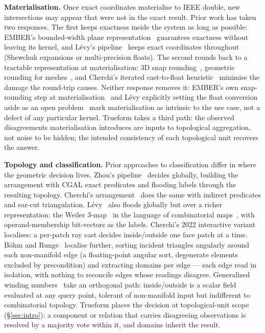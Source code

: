 \documentclass{egpubl}
\begin{document}
\textbf{Materialisation.} Once exact coordinates materialise to IEEE double, new intersections may appear that were not in the exact result. Prior work has taken two responses. The first keeps exactness inside the system as long as possible: EMBER's bounded-width plane representation~\cite{Trettner2022,NehringWirxel2021} guarantees exactness without leaving its kernel, and L\'evy's pipeline~\cite{Levy2025} keeps exact coordinates throughout (Shewchuk expansions or multi-precision floats). The second rounds back to a tractable representation at materialisation: 3D snap rounding~\cite{DevillersLazardLenhart2018,Valque2019}, geometric rounding for meshes~\cite{MilenkovicSacks2019}, and Cherchi's iterated cast-to-float heuristic~\cite{Cherchi2020} minimise the damage the round-trip causes. Neither response removes it: EMBER's own snap-rounding step at materialisation~\cite{Trettner2022} and L\'evy explicitly setting the float conversion aside as an open problem~\cite{Levy2025} mark materialisation as intrinsic to the use case, not a defect of any particular kernel. Trueform takes a third path: the observed disagreements materialisation introduces are inputs to topological aggregation, not noise to be hidden; the intended consistency of each topological unit recovers the answer.

\textbf{Topology and classification.} Prior approaches to classification differ in where the geometric decision lives. Zhou's pipeline~\cite{Zhou2016} decides globally, building the arrangement with CGAL exact predicates and flooding labels through the resulting topology. Cherchi's arrangement~\cite{Cherchi2020} does the same with indirect predicates and ear-cut triangulation. L\'evy~\cite{Levy2025} also floods globally but over a richer representation: the Weiler 3-map~\cite{Weiler1985} in the language of combinatorial maps~\cite{Lienhardt1988}, with operand-membership bit-vectors as the labels. Cherchi's 2022 interactive variant~\cite{Cherchi2022} localises: a per-patch ray cast decides inside/outside one face patch at a time. B\"ohm and Runge~\cite{BohmRunge2025} localise further, sorting incident triangles angularly around each non-manifold edge (a floating-point angular sort, degenerate elements excluded by precondition) and extracting domains per edge --- each edge read in isolation, with nothing to reconcile edges whose readings disagree. Generalized winding numbers~\cite{JacobsonKavanSorkine2013} take an orthogonal path: inside/outside is a scalar field evaluated at any query point, tolerant of non-manifold input but indifferent to combinatorial topology. Trueform places the decision at topological-unit scope (\S\ref{sec:intro}): a component or relation that carries disagreeing observations is resolved by a majority vote within it, and domains inherit the result.
\end{document}
